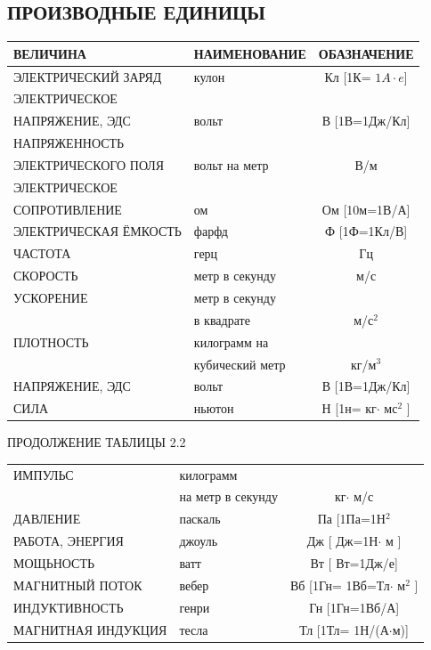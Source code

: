 \documentclass[12pt, letterpaper, twoside]{article}
\begin{document}
\subsection{ПРОИЗВОДНЫЕ ЕДИНИЦЫ} 
\begin{tabular}{ || l | l | c || }
\hline
ВЕЛИЧИНА& НАИМЕНОВАНИЕ & ОБАЗНАЧЕНИЕ  \\ \hline
ЭЛЕКТРИЧЕСКИЙ ЗАРЯД & кулон &  Кл  [1К= $1A\cdot e$] \\ \hline
ЭЛЕКТРИЧЕСКОЕ&&\\
 НАПРЯЖЕНИЕ, ЭДС & вольт & В [1В=1Дж/Кл] \\ \hline
НАПРЯЖЕННОСТЬ & &\\
ЭЛЕКТРИЧЕСКОГО ПОЛЯ &  вольт на метр  & В/м\\ \hline
ЭЛЕКТРИЧЕСКОЕ & &\\
СОПРОТИВЛЕНИЕ& ом & Ом [10м=1В/А] \\ \hline
ЭЛЕКТРИЧЕСКАЯ ЁМКОСТЬ & фарфд & Ф [1Ф=1Кл/В] \\ \hline
ЧАСТОТА& герц & Гц \\ \hline
СКОРОСТЬ& метр в секунду & м/с  \\ \hline
УСКОРЕНИЕ & метр в секунду&\\
& в квадрате & м/с$^2$ \\ \hline
ПЛОТНОСТЬ & килограмм на&\\
& кубический метр & кг/м$^3$ \\ \hline
НАПРЯЖЕНИЕ, ЭДС & вольт & В [1В=1Дж/Кл] \\ \hline
СИЛА& ньютон &   Н  [1н= кг$\cdot$ мс$^2$ ] \\ \hline
\hline
\end{tabular}
\newline
\begin{flushleft}
ПРОДОЛЖЕНИЕ ТАБЛИЦЫ 2.2
\end{flushleft}
\begin{tabular}{ || l | l | c || }
\hline
ИМПУЛЬС & килограмм & \\
& на метр в секунду &  кг$\cdot$ м/с \\ \hline
ДАВЛЕНИЕ & паскаль & Па [1Па=1Н$^2$  \\ \hline
РАБОТА, ЭНЕРГИЯ & джоуль &   Дж [ Дж=1Н$\cdot$ м ] \\ \hline
МОЩЬНОСТЬ & ватт&   Вт [ Вт=1Дж/е] \\ \hline
МАГНИТНЫЙ ПОТОК& вебер &   Вб  [1Гн= 1Вб=Тл$\cdot$ м$^2$ ] \\ \hline
ИНДУКТИВНОСТЬ & генри &   Гн [1Гн=1Вб/А] \\ \hline
МАГНИТНАЯ ИНДУКЦИЯ& тесла &   Тл [1Тл= 1Н/(А$\cdot$м)] \\ \hline
\hline
\end{tabular}
\end{document}
